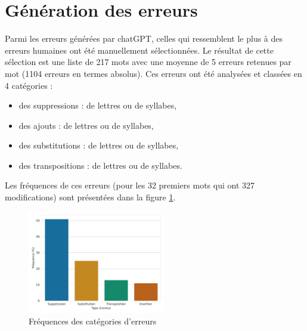 \section{Génération des erreurs}%
\label{sec.results.errors}

Parmi les erreurs générées par chatGPT, 
celles qui ressemblent le plus à des erreurs humaines ont été manuellement sélectionnées.
Le résultat de cette sélection est une liste de 217 mots 
avec une moyenne de 5 erreurs retenues par mot (1104 erreurs en termes absolus).
Ces erreurs ont été analysées et classées en 4 catégories :
\begin{itemize}
    \item des suppressions : de lettres ou de syllabes,
    \item des ajouts : de lettres ou de syllabes,
    \item des substitutions : de lettres ou de syllabes,
    \item des transpositions : de lettres ou de syllabes.
\end{itemize}

Les fréquences de ces erreurs (pour les 32 premiers mots qui ont 327 modifications) 
sont présentées dans la figure \ref{fig.errors-freq}.

\begin{figure}[htp]
    \centering
    \includegraphics[width=6cm]{assets/python/rules-stats.pdf}
    \caption{Fréquences des catégories d'erreurs}
    \label{fig.errors-freq}
\end{figure}

